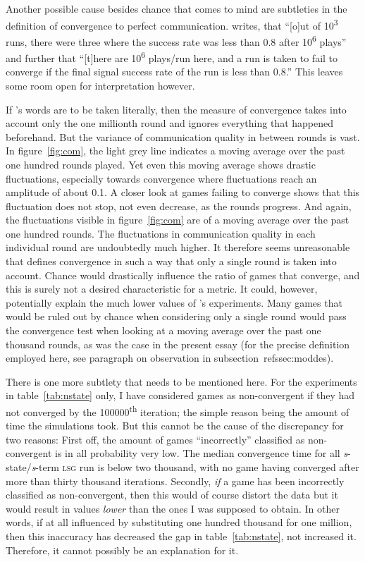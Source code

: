 \documentclass[
	DIV=calc,
	BCOR=0mm,
	pagesize,
	titlepage
]{scrartcl}
\newcommand{\lsg}{\textsc{lsg}}
\newcommand{\nslsg}[1]{\textit{#1}-state/\textit{#1}-term \lsg}
\begin{document}
Another possible cause besides chance that comes to mind are subtleties in the definition of convergence to perfect communication.
\citet[sec.~2, unpaginated preprint]{barrett_numerical_2006} writes, that ``[o]ut of 10\textsuperscript{3} runs, there were three where the success rate was less than 0.8 after 10\textsuperscript{6} plays'' and further that ``[t]here are 10\textsuperscript{6} plays/run here, and a run is taken to fail to converge if the final signal success rate of the run is less than 0.8.''
This leaves some room open for interpretation however.

If \citeauthor{barrett_numerical_2006}'s words are to be taken literally, then the measure of convergence takes into account only the one millionth round and ignores everything that happened beforehand.
But the variance of communication quality in between rounds is vast.
In figure~\ref{fig:com}, the light grey line indicates a moving average over the past one hundred rounds played.
Yet even this moving average shows drastic fluctuations, especially towards convergence where fluctuations reach an amplitude of about 0.1.
A closer look at games failing to converge shows that this fluctuation does not stop, not even decrease, as the rounds progress.
And again, the fluctuations visible in figure~\ref{fig:com} are of a moving average over the past one hundred rounds.
The fluctuations in communication quality in each individual round are undoubtedly much higher.
It therefore seems unreasonable that \citeauthor{barrett_numerical_2006} defines convergence in such a way that only a single round is taken into account.
Chance would drastically influence the ratio of games that converge, and this is surely not a desired characteristic for a metric.
It could, however, potentially explain the much lower values of \citeauthor{barrett_numerical_2006}'s experiments.
Many games that would be ruled out by chance when considering only a single round would pass the convergence test when looking at a moving average over the past one thousand rounds, as was the case in the present essay (for the precise definition employed here, see paragraph on observation in subsection~ref{ssec:moddes}).

There is one more subtlety that needs to be mentioned here.
For the experiments in table~\ref{tab:nstate} only, I have considered games as non-convergent if they had not converged by the 100000\textsuperscript{th} iteration; the simple reason being the amount of time the simulations took.
But this cannot be the cause of the discrepancy for two reasons:
First off, the amount of games ``incorrectly'' classified as non-convergent is in all probability very low.
The median convergence time for all \nslsg s run is below two thousand, with no game having converged after more than thirty thousand iterations.
Secondly, \emph{if} a game has been incorrectly classified as non-convergent, then this would of course distort the data but it would result in values \emph{lower} than the ones I was supposed to obtain.
In other words, if at all influenced by substituting one hundred thousand for one million, then this inaccuracy has decreased the gap in table~\ref{tab:nstate}, not increased it.
Therefore, it cannot possibly be an explanation for it.
\end{document}
